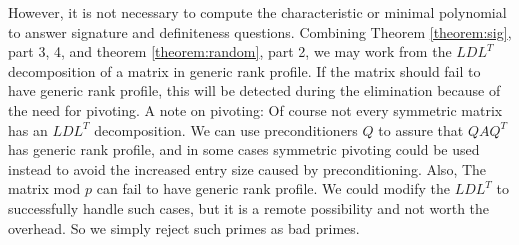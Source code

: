 \documentclass{acm_proc_article-sp}
\begin{document}
However,
it is not necessary to compute the characteristic or minimal 
polynomial to answer signature and definiteness questions.  
Combining Theorem \ref{theorem:sig}, part 3, 4, 
and theorem \ref{theorem:random},
part 2,  we may work from 
the $LDL^T$ decomposition of a matrix in generic rank profile.  
If the matrix should fail to have generic rank profile, this will be detected during
the elimination because of the need for pivoting.
A note on pivoting:
Of course not every symmetric matrix has an $LDL^T$ decomposition.  
We can use preconditioners $Q$ to assure that $QAQ^T$ has generic
rank profile,
and in some cases symmetric pivoting could be used instead to avoid the 
increased entry size caused by preconditioning.  
Also, The matrix mod $p$ can fail to have generic rank profile.
We could modify the $LDL^T$ to successfully handle such cases, but it is a 
remote possibility and not worth the overhead.  
So we simply reject such primes as bad primes.
\end{document}
